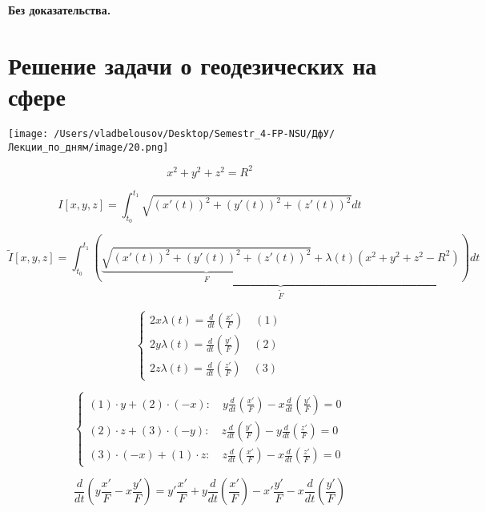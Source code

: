 \documentclass[12pt, a4paper]{report}
\begin{document}
\textbf{Без доказательства.} 

\section{Решение задачи о геодезических на сфере}

\begin{center}
    \texttt{[image: /Users/vladbelousov/Desktop/Semestr\_4-FP-NSU/ДфУ/Лекции\_по\_дням/image/20.png]}
\end{center}

\[ x ^2  +y ^2 + z ^2 = R ^2  \] 

\[ I [x,y,z] = \int_{t_0}^{t_1} \sqrt{(x' (t )) ^2 + (y' (t )) ^2 + (z' (t )) ^2 }dt \] 

\[ \tilde{I } [x,y ,z ] = \int _{t_0}^{t_1}  \underbrace{\left(  \underbrace{\sqrt{(x' (t )) ^2 + (y' (t )) ^2 + (z' (t )) ^2 }}_{F}  + \lambda(t)(x ^2  +y ^2 + z ^2 - R ^2 ) \right)}_{\tilde{F}}  dt  \] 

\[\begin{cases}
    \displaystyle 2 x \lambda (t ) = \frac{d}{dt } \left( \frac{x' }{F}  \right) \quad (1)   \\
    \displaystyle 2 y \lambda (t ) = \frac{d}{dt } \left( \frac{y' }{F}  \right)  \quad (2)\\
    \displaystyle 2 z \lambda (t ) = \frac{d}{dt } \left( \frac{z' }{F}  \right) \quad (3)
\end{cases} \] 

\[ \begin{cases}
    \displaystyle (1) \cdot y + (2) \cdot (-x):\quad  y \frac{d}{dt } \left( \frac{x' }{F} \right) -x \frac{d}{dt } \left( \frac{y' }{F} \right) = 0 \\
    \displaystyle (2) \cdot z + (3 ) \cdot (- y) :\quad z \frac{d}{dt } \left( \frac{y' }{F} \right) -y \frac{d}{dt } \left( \frac{z' }{F} \right) = 0 \\
    \displaystyle (3) \cdot (-x) + (1) \cdot  z : \quad z \frac{d}{dt } \left( \frac{x' }{F} \right) -x \frac{d}{dt } \left( \frac{z' }{F} \right) = 0 
\end{cases} \] 

\[ \frac{d}{dt } \left( y \frac{x ' }{F }  - x \frac{y '}{F}  \right) = y ' \frac{x ' }{F } + y \frac{d}{dt } \left( \frac{x' }{F}  \right) - x ' \frac{y '}{F} - x \frac{d}{dt } \left( \frac{y' }{F}  \right) \] 
\end{document}
